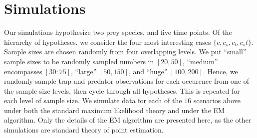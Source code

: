 \section*{Simulations}

Our simulations hypothesize two prey species, and five time points.  Of the hierarchy of hypotheses, we consider the four most interesting cases $\{c, c_s, c_t, c_st\}$.  Sample sizes are chosen randomly from four overlapping levels.  We put ``small'' sample sizes to be randomly sampled numbers in $[20,50]$, ``medium'' encompasses $[30:75]$, ``large'' $[50,150]$, and ``huge'' $[100,200]$.  Hence, we randomly sample trap and predator observations for each occurence from one of the sample size levels, then cycle through all hypotheses.  This is repeated for each level of sample size.  We simulate data for each of the $16$ scenarios above under both the standard maximum likelihood theory and under the EM algorithm.  Only the details of the EM algorithm are presented here, as the other simulations are standard theory of point estimation.  











